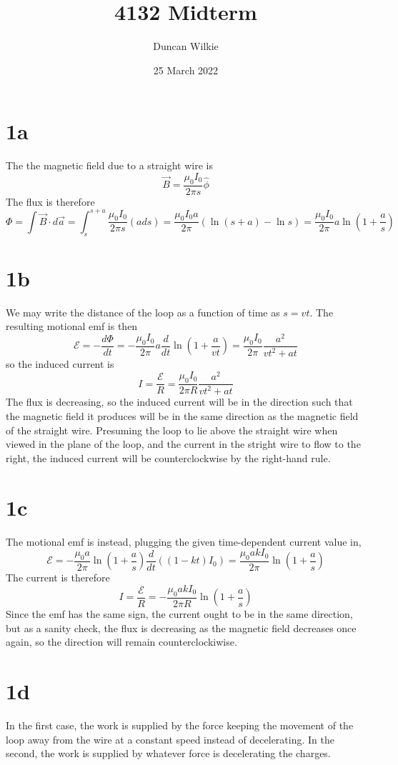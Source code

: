 \documentclass{article}
\title{4132 Midterm}
\author{Duncan Wilkie}
\date{25 March 2022}
\begin{document}
\maketitle

\section*{1a}
The the magnetic field due to a straight wire is
\[\vec{B}=\frac{\mu_{0}I_{0}}{2\pi s}\hat{\phi}\]
The flux is therefore
\[\Phi=\int\vec{B}\cdot d\vec{a}=\int_{s}^{s+a}\frac{\mu_{0}I_{0}}{2\pi s} (ads)=\frac{\mu_{0}I_{0}a}{2\pi}\left( \ln(s+a)-\ln s \right)=\frac{\mu_{0}I_{0}}{2\pi}a\ln\left(1+\frac{a}{s}\right)\]
\section*{1b}
We may write the distance of the loop as a function of time as $s=vt$.
The resulting motional emf is then
\[\mathcal{E}=-\frac{d\Phi}{dt}=-\frac{\mu_{0}I_{0}}{2\pi}a\frac{d}{dt}\ln\left( 1+\frac{a}{vt} \right)=\frac{\mu_{0}I_{0}}{2\pi}\frac{a^{2}}{vt^{2}+{at}}\]
so the induced current is
\[I=\frac{\mathcal{E}}{R}=\frac{\mu_{0}I_{0}}{2\pi R}\frac{a^{2}}{vt^{2}+at}\]
The flux is decreasing, so the induced current will be in the direction such that the magnetic field it produces will be in the same direction as the magnetic field of the straight wire. Presuming the loop to lie above the straight wire when viewed in the plane of the loop, and the current in the stright wire to flow to the right, the induced current will be counterclockwise by the right-hand rule.

\section*{1c}
The motional emf is instead, plugging the given time-dependent current value in,
\[\mathcal{E}=-\frac{\mu_{0}a}{2\pi}\ln\left( 1+\frac{a}{s} \right)\frac{d}{dt}\left( (1-kt)I_{0} \right)=\frac{\mu_{0}akI_{0}}{2\pi}\ln\left( 1+\frac{a}{s} \right)\]
The current is therefore
\[I=\frac{\mathcal{E}}{R}=-\frac{\mu_{0} akI_{0}}{2\pi R}\ln\left( 1+\frac{a}{s} \right)\]
Since the emf has the same sign, the current ought to be in the same direction, but as a sanity check, the flux is decreasing as the magnetic field decreases once again, so the direction will remain counterclockiwise.

\section*{1d}
In the first case, the work is supplied by the force keeping the movement of the loop away from the wire at a constant speed instead of decelerating. In the second, the work is supplied by whatever force is decelerating the charges.
\end{document}

